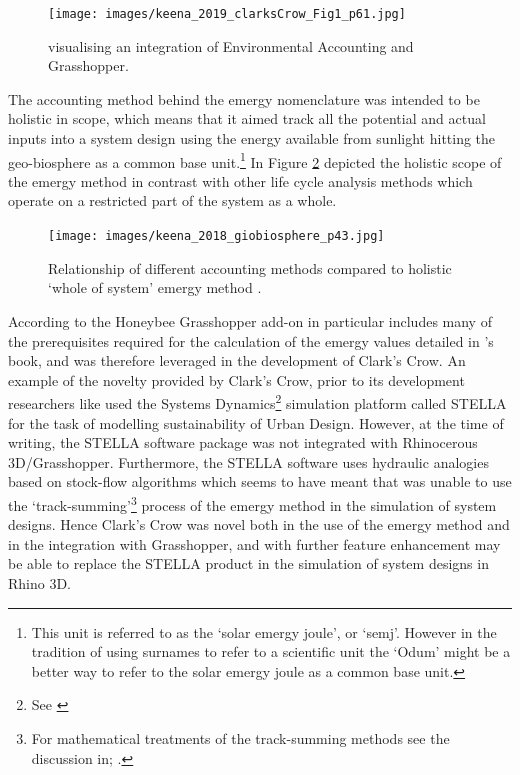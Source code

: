 \begin{figure}[H]
    \centering
    \texttt{[image: images/keena\_2019\_clarksCrow\_Fig1\_p61.jpg]}
    \caption{\citeauthor{keena_benefit_2019} \citeyearpar[Fig.~1, p.~61]{keena_benefit_2019} visualising an integration of Environmental Accounting and Grasshopper.}
    \label{fig:clarkscrow:workflow}
\end{figure}

The accounting method behind the emergy nomenclature was intended to be holistic in scope, which means that it aimed track all the potential and actual inputs into a system design using the energy available from sunlight hitting the geo-biosphere as a common base unit.\footnote{This unit is referred to as the `solar emergy joule', or `semj'. However in the tradition of using surnames to refer to a scientific unit the `Odum' might be a better way to refer to the solar emergy joule as a common base unit.} In Figure \ref{fig:holistic} \citeauthor{keena_clark_2018} depicted the holistic scope of the emergy method in contrast with other life cycle analysis methods which operate on a restricted part of the system as a whole.

\begin{figure}[h!]
    \centering
    \texttt{[image: images/keena\_2018\_giobiosphere\_p43.jpg]}
    \caption{Relationship of different accounting methods compared to holistic `whole of system'  emergy method \cite[p.~43]{keena_clark_2018}.}
    \label{fig:holistic}
\end{figure}

According to \citeauthor{keena_clark_2018} the Honeybee Grasshopper add-on in particular includes many of the prerequisites required for the calculation of the emergy values detailed in \citeauthor{odum_environmental_1996}'s book, and was therefore leveraged in the development of Clark's Crow. An example of the novelty provided by Clark's Crow, prior to its development researchers like \cite{tabony_ecological_2021} used the Systems Dynamics\footnote{See \cite{forrester_principles_1999}} simulation platform called STELLA for the task of modelling sustainability of Urban Design. However, at the time of writing, the STELLA software package was not integrated with Rhinocerous 3D/Grasshopper. Furthermore, the STELLA software uses hydraulic analogies based on stock-flow algorithms \cite[p.~100, Fig.~3.43]{tabony_ecological_2021} which seems to have meant that \citeauthor{tabony_ecological_2021} was unable to use the `track-summing'\footnote{For mathematical treatments of the track-summing methods see the discussion in; \cite{tennenbaum_network_1988, tennenbaum_emergy_2015, tennenbaum_odumtennenbaumbrown_2015, le_corre_odumtennenbaumbrown_2015}.} process of the emergy method in the simulation of system designs. Hence Clark's Crow was novel both in the use of the emergy method and in the integration with Grasshopper, and with further feature enhancement may be able to replace the STELLA product in the simulation of system designs in Rhino 3D.

